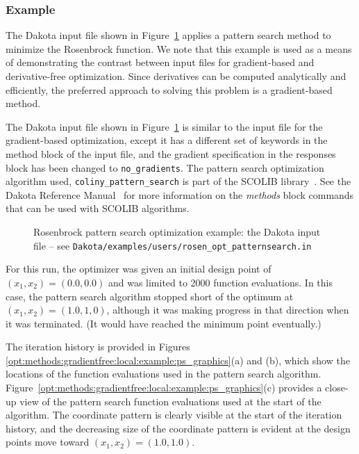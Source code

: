 \subsubsection{Example}
\label{opt:methods:gradientfree:local:example}

The Dakota input file shown in
Figure~\ref{opt:methods:gradientfree:local:example:ps} applies a
pattern search method to minimize the Rosenbrock function. We note
that this example is used as a means of demonstrating the contrast
between input files for gradient-based and derivative-free
optimization.  Since derivatives can be computed analytically and
efficiently, the preferred approach to solving this problem is a
gradient-based method.

The Dakota input file shown in
Figure~\ref{opt:methods:gradientfree:local:example:ps} is similar to
the input file for the gradient-based optimization, except it has a
different set of keywords in the method block of the input file, and
the gradient specification in the responses block has been changed to
\texttt{no\_gradients}. The pattern search optimization algorithm
used, \texttt{coliny\_pattern\_search} is part of the SCOLIB
library~\cite{Har06}. See the Dakota Reference Manual~\cite{RefMan}
for more information on the \emph{methods} block commands that can be
used with SCOLIB algorithms.

\begin{figure}[ht!]
  \centering
  \begin{bigbox}
    \begin{small}
    \end{small}
  \end{bigbox}
  \caption{Rosenbrock pattern search optimization example: the Dakota input file --
see \texttt{Dakota/examples/users/rosen\_opt\_patternsearch.in} }
  \label{opt:methods:gradientfree:local:example:ps}
\end{figure}

For this run, the optimizer was given an initial design point of
$(x_1,x_2) = (0.0,0.0)$ and was limited to 2000 function
evaluations. In this case, the pattern search algorithm stopped short
of the optimum at $(x_1,x_2) = (1.0,1,0)$, although it was making
progress in that direction when it was terminated. (It would have
reached the minimum point eventually.)

The iteration history is provided in Figures~
\ref{opt:methods:gradientfree:local:example:ps_graphics}(a) and (b),
which show the locations of the function evaluations used in the
pattern search algorithm.
Figure~\ref{opt:methods:gradientfree:local:example:ps_graphics}(c)
provides a close-up view of the pattern search function evaluations
used at the start of the algorithm. The coordinate pattern is clearly
visible at the start of the iteration history, and the decreasing size
of the coordinate pattern is evident at the design points move toward
$(x_1,x_2) = (1.0,1.0)$.

